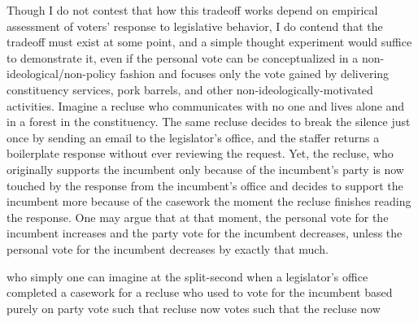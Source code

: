 \documentclass[hyphens, crop=false]{standalone}
\begin{document}
		Though
		I do not contest that how this tradeoff works depend on empirical assessment of voters' response to legislative behavior,
		I do contend that the tradeoff must exist at some point,
		and a simple thought experiment would suffice to demonstrate it,
%		 
%		
%		
		even if the personal vote can be conceptualized in a non-ideological/non-policy fashion and focuses only the vote gained by delivering constituency services,
		pork barrels,
		and other non-ideologically-motivated activities.
		Imagine a recluse who communicates with no one and lives alone and in a forest in the constituency.
		The same recluse decides to break the silence just once by sending an email to the legislator's office,
		and the staffer returns a boilerplate response without ever reviewing the request.
		Yet,
		the recluse,
		who originally supports the incumbent only because of the incumbent's party
		is now touched by the response from the incumbent's office and decides to support the incumbent more because of the casework the moment the recluse finishes reading the response.
		One may argue that at that moment,
		the personal vote for the incumbent increases and the party vote for the incumbent decreases,
		unless
		the personal vote for the incumbent decreases by exactly that much.
		
		
		who simply 
		one can imagine at the split-second when a legislator's office
		completed a casework for a recluse who used to vote for the incumbent based purely on party vote
		such that recluse now votes
		such that the recluse now
		
\end{document}
